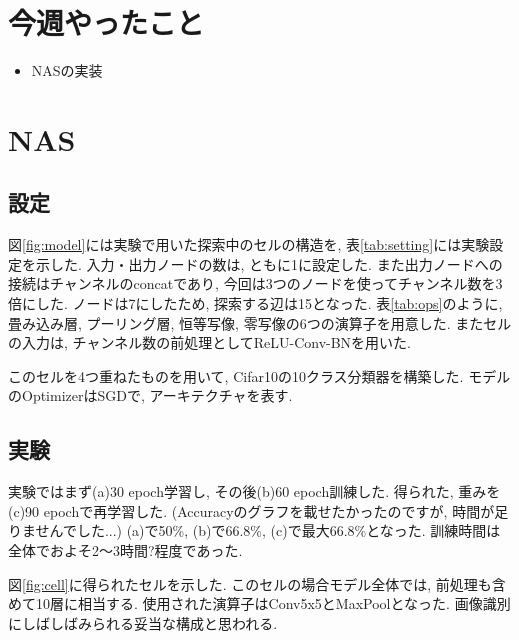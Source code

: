 \documentclass[twocolumn]{jarticle}     %
\begin{document}


\section{今週やったこと}
\begin{itemize}
	\item {NASの実装}
\end{itemize}

\section{NAS}
\subsection{設定}
図\ref{fig:model}には実験で用いた探索中のセルの構造を,
表\ref{tab:setting}には実験設定を示した.
入力・出力ノードの数は, ともに1に設定した.
また出力ノードへの接続はチャンネルのconcatであり, 今回は3つのノードを使ってチャンネル数を3倍にした.
ノードは7にしたため, 探索する辺は15となった.
表\ref{tab:ops}のように, 畳み込み層, プーリング層, 恒等写像, 零写像の6つの演算子を用意した.
またセルの入力は, チャンネル数の前処理としてReLU-Conv-BNを用いた.

このセルを4つ重ねたものを用いて, Cifar10の10クラス分類器を構築した.
モデルのOptimizerはSGDで, アーキテクチャを表す.

\subsection{実験}
実験ではまず(a)30 epoch学習し,
その後(b)60 epoch訓練した.
得られた, 重みを(c)90 epochで再学習した.
(Accuracyのグラフを載せたかったのですが, 時間が足りませんでした...)
(a)で50\%, (b)で66.8\%, (c)で最大66.8\%となった.
訓練時間は全体でおよそ2～3時間?程度であった.

図\ref{fig:cell}に得られたセルを示した.
このセルの場合モデル全体では, 前処理も含めて10層に相当する.
使用された演算子はConv5x5とMaxPoolとなった.
画像識別にしばしばみられる妥当な構成と思われる.
\end{document}
